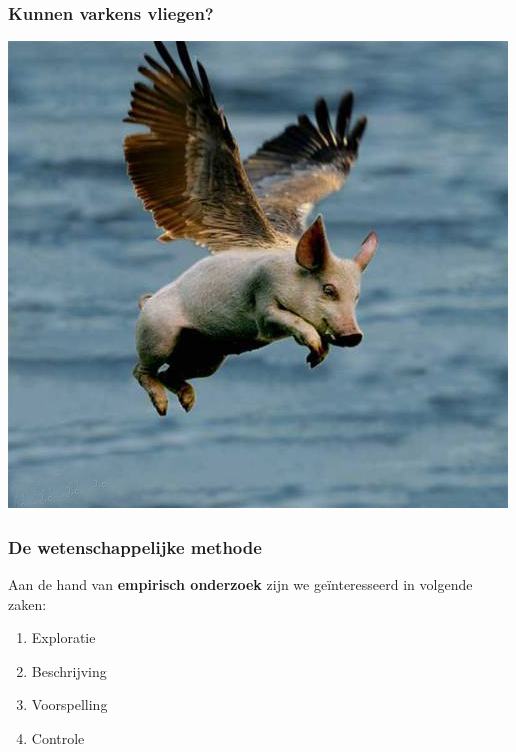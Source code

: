 \documentclass[aspectratio=169]{beamer}
\begin{document}
\begin{frame}
  \frametitle{Kunnen varkens vliegen?}
  \centering
  \includegraphics[height=.8\textheight]{img/les1-04}
\end{frame}

\begin{frame}
  \frametitle{De wetenschappelijke methode}

  Aan de hand van \textbf{empirisch onderzoek} zijn we geïnteresseerd in volgende zaken:

  \begin{enumerate}
    \item Exploratie
    \item Beschrijving
    \item Voorspelling
    \item Controle
  \end{enumerate}
\end{frame}
\end{document}
